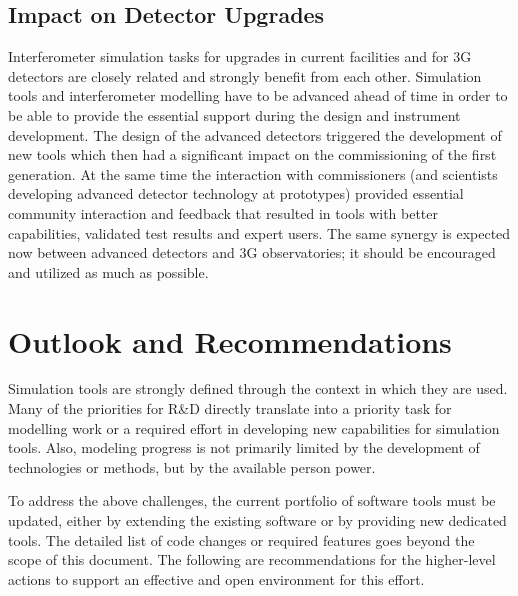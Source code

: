 \subsection{Impact on Detector Upgrades}
Interferometer simulation tasks for upgrades in current facilities and for 3G detectors are closely related and strongly benefit from each other. Simulation tools and interferometer modelling have to be advanced ahead of time in order to be able to provide the essential
support during the design and instrument development. The design of the advanced detectors triggered the development of new tools which then had a significant impact on the commissioning of the first generation. At the same time the interaction with commissioners (and scientists developing advanced detector
technology at prototypes) provided essential community interaction and feedback that resulted in tools with better capabilities, validated test results and expert users. The same synergy is expected now between advanced detectors and 3G observatories; it should be encouraged and utilized as much as possible.

\section{Outlook and Recommendations}
Simulation tools are strongly defined through the context in which they are used. Many of the priorities for R\&D directly translate into a priority task for modelling work or a required effort in developing new capabilities for simulation tools. Also, modeling progress is not primarily limited by the development of technologies or methods, but by the available person power.

To address the above challenges, the current portfolio of software tools must be updated, either by extending the existing software or by providing new dedicated tools. The detailed list of code changes or required features goes beyond the scope of this document. The following are recommendations for the higher-level actions to support an effective and open environment for this effort.

